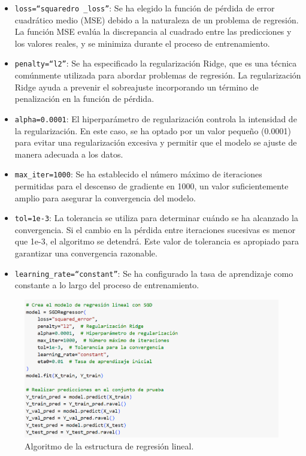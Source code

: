 \begin{itemize}
  \item \texttt{loss=“squaredro \_loss”}: Se ha elegido la función de pérdida de error cuadrático medio (MSE) debido a la naturaleza de un problema de regresión. La función MSE evalúa la discrepancia al cuadrado entre las predicciones y los valores reales, y se minimiza durante el proceso de entrenamiento.

  \item \texttt{penalty=“l2”}: Se ha especificado la regularización Ridge, que es una técnica comúnmente utilizada para abordar problemas de regresión. La regularización Ridge ayuda a prevenir el sobreajuste incorporando un término de penalización en la función de pérdida.

  \item \texttt{alpha=0.0001}: El hiperparámetro de regularización controla la intensidad de la regularización. En este caso, se ha optado por un valor pequeño (0.0001) para evitar una regularización excesiva y permitir que el modelo se ajuste de manera adecuada a los datos.

  \item \texttt{max\_iter=1000}: Se ha establecido el número máximo de iteraciones permitidas para el descenso de gradiente en 1000, un valor suficientemente amplio para asegurar la convergencia del modelo.

  \item \texttt{tol=1e-3}: La tolerancia se utiliza para determinar cuándo se ha alcanzado la convergencia. Si el cambio en la pérdida entre iteraciones sucesivas es menor que 1e-3, el algoritmo se detendrá. Este valor de tolerancia es apropiado para garantizar una convergencia razonable.

  \item \texttt{learning\_rate=“constant”}: Se ha configurado la tasa de aprendizaje como constante a lo largo del proceso de entrenamiento.
\end{itemize}

\begin{figure}[H]
    \begin{center}
      \includegraphics[scale=0.50]{./regresion lineal estructura.png}
      \caption{Algoritmo de la estructura de regresión lineal.}
      \label{fig:estructura_lineal}
    \end{center}
  \end{figure}


